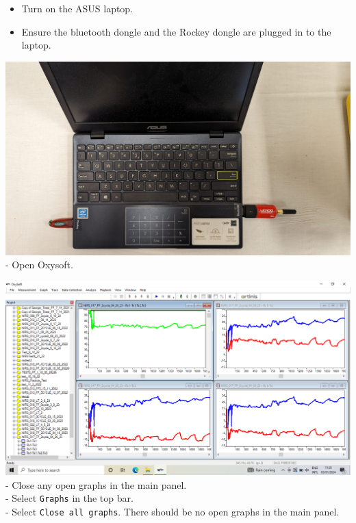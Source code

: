 \documentclass[
]{book}
\providecommand{\tightlist}{%
  \setlength{\itemsep}{0pt}\setlength{\parskip}{0pt}}
\begin{document}
\begin{itemize}
\tightlist
\item
  Turn on the ASUS laptop.\\
\item
  Ensure the bluetooth dongle and the Rockey dongle are plugged in to the laptop.
\end{itemize}

\includegraphics[width=1\linewidth]{images/laptopwithplugins}
- Open Oxysoft.

\includegraphics[width=1\linewidth]{images/startnewmeasurement/01_open_oxysoft}
- Close any open graphs in the main panel.\\
- Select \texttt{Graphs} in the top bar.\\
- Select \texttt{Close\ all\ graphs}. There should be no open graphs in the main panel.
\end{document}
